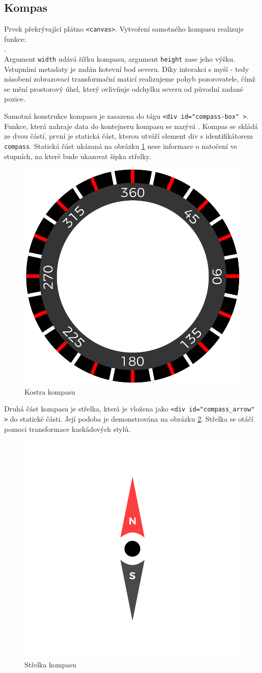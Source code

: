 \subsection{Kompas}
Prvek překrývající plátno \texttt{<canvas>}. Vytvoření samotného kompasu realizuje funkce: \\\texttt{\createCompassFull}.\\ Argument \texttt{width} udává šířku kompasu, argument \texttt{height} zase jeho výšku. Vstupními metadaty je zadán kotevní bod severu. Díky interakci s myší - tedy násobení zobrazovací transformační maticí realizujeme pohyb pozorovatele, čímž se mění prostorový úhel, který ovlivňuje odchylku severu  od původní zadané pozice.

Samotná konstrukce kompasu je zasazena do tágu \texttt{<div id="compass-box"\,>}. Funkce, která nahraje data do kontejneru kompasu se nazývá \texttt{\createCompass}. Kompas se skládá ze dvou částí, první je statická část, kterou utváří element div s identifikátorem \texttt{compass}. Statická část ukázaná  na obrázku \ref{img:kompas_kostra} nese informace o natočení ve stupních, na které bude ukazovat šipka střelky. 


\begin{figure}[h]
	\label{img:kompas_kostra}
	\centering
	\includegraphics[scale=1.0,angle=0,width=0.37\linewidth]{obrazky-figures/kompas_kostra}
	\caption{Kostra kompasu}
\end{figure}

 

Druhá část kompasu je střelka, která je vložena jako \texttt{<div id="compass\_arrow"\,>} do statické části. Její podoba je demonstrována na obrázku \ref{img:kompas_strelka}. Střelka se  otáčí pomoci transformace kaskádových stylů.

\begin{figure}[h]
	\label{img:kompas_strelka}
	\centering
	\includegraphics[scale=1.0,angle=0,width=0.4\linewidth]{obrazky-figures/kompas_strelka}
	\caption{Střelka kompasu}
\end{figure}




